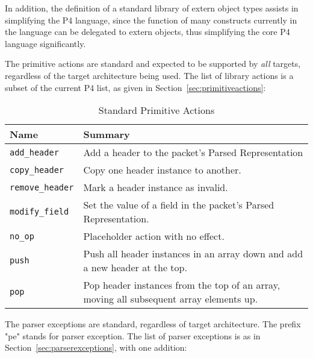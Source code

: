 \documentclass[12pt]{article}
\begin{document}
In addition, the definition of a standard library of extern object types
assists in simplifying the P4 language, since the function of many constructs
currently in the language can be delegated to extern objects, thus simplifying
the core P4 language significantly.


The primitive actions are standard and expected to be supported
by \textit{all} targets, regardless of the target architecture being used.
The list of library actions is a subset of the current P4 list, as
given in Section~\ref{sec:primitiveactions}:

\begin{table}[H]
\begin{center}
\begin{tabular}{| l | p{} |} \hline
\textbf{Name} &
\textbf{Summary} \\ \hline
\texttt{add_header} &
Add a header to the packet's Parsed Representation \\ \hline
\texttt{copy_header} &
Copy one header instance to another. \\ \hline
\texttt{remove_header} &
Mark a header instance as invalid. \\ \hline
\texttt{modify_field} &
Set the value of a field in the packet's Parsed Representation. \\ \hline
\texttt{no_op} &
Placeholder action with no effect. \\ \hline
\texttt{push} &
Push all header instances in an array down and add a new header at the top. \\ \hline
\texttt{pop} &
Pop header instances from the top of an array, moving all subsequent array elements up. \\ \hline
\end{tabular}
\end{center}
\caption{Standard Primitive Actions}
\label{tab:primitiveactions}
\end{table}


The parser exceptions are standard, regardless of target architecture.
The prefix "pe" stands for parser exception.  The list of parser
exceptions is as in Section~\ref{sec:parserexceptions}, with one addition:
\end{document}
